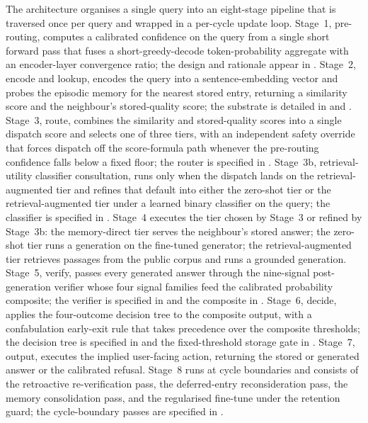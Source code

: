 The architecture organises a single query into an eight-stage pipeline that is traversed once per query and wrapped in a per-cycle update loop. Stage~1, pre-routing, computes a calibrated confidence on the query from a single short forward pass that fuses a short-greedy-decode token-probability aggregate with an encoder-layer convergence ratio; the design and rationale appear in . Stage~2, encode and lookup, encodes the query into a sentence-embedding vector and probes the episodic memory for the nearest stored entry, returning a similarity score and the neighbour's stored-quality score; the substrate is detailed in  and . Stage~3, route, combines the similarity and stored-quality scores into a single dispatch score and selects one of three tiers, with an independent safety override that forces dispatch off the score-formula path whenever the pre-routing confidence falls below a fixed floor; the router is specified in . Stage~3b, retrieval-utility classifier consultation, runs only when the dispatch lands on the retrieval-augmented tier and refines that default into either the zero-shot tier or the retrieval-augmented tier under a learned binary classifier on the query; the classifier is specified in . Stage~4 executes the tier chosen by Stage~3 or refined by Stage~3b: the memory-direct tier serves the neighbour's stored answer; the zero-shot tier runs a generation on the fine-tuned generator; the retrieval-augmented tier retrieves passages from the public corpus and runs a grounded generation. Stage~5, verify, passes every generated answer through the nine-signal post-generation verifier whose four signal families feed the calibrated probability composite; the verifier is specified in  and the composite in . Stage~6, decide, applies the four-outcome decision tree to the composite output, with a confabulation early-exit rule that takes precedence over the composite thresholds; the decision tree is specified in  and the fixed-threshold storage gate in . Stage~7, output, executes the implied user-facing action, returning the stored or generated answer or the calibrated refusal. Stage~8 runs at cycle boundaries and consists of the retroactive re-verification pass, the deferred-entry reconsideration pass, the memory consolidation pass, and the regularised fine-tune under the retention guard; the cycle-boundary passes are specified in .

